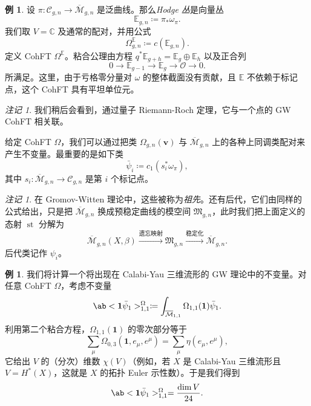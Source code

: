 \documentclass{amsart}
\theoremstyle{definition}
\newtheorem{exm}[thm]{例}
\theoremstyle{remark}
\newtheorem{rmk}[thm]{注记}
\theoremstyle{plain}
\theoremstyle{definition}
\theoremstyle{remark}
\newcommand{\C}{\mathbb{C}}
\newcommand{\E}{\mathbb{E}}
\newcommand{\Mbar}{\overline{\mathcal{M}}}
\newcommand{\mc}[1]{\mathcal{#1}}
\newcommand{\mf}[1]{\mathfrak{#1}}
\newcommand{\mbf}[1]{\mathbf{#1}}
\newcommand{\bv}{\mbf{v}}
\newcommand{\1}{\mathbf{1}}
\newcommand{\2}{\mathbf{2}}
\newcommand{\3}{\mathbf{3}}
\DeclareMathOperator{\st}{st}
\begin{document}
\begin{exm}
    设 $\pi \colon \mc{C}_{g,n} \to \Mbar_{g,n}$ 是泛曲线。那么\textit{Hodge 丛}是向量丛
    \[ \E_{g,n} \coloneqq \pi_* \omega_{\pi}. \]
    我们取 $V = \C$ 及通常的配对，并用公式
    \[ \Omega^{\E}_{g,n} \coloneqq c(\E_{g,n}). \]
    定义 CohFT $\Omega^{\E}$。粘合公理由方程 $q^* \E_{g+h} = \E_g \oplus \E_h$ 以及正合列
    \[ 0 \to \E_{g-1} \to \E_g \to \mc{O} \to 0. \]
    所满足。这里，由于亏格零分量对 $\omega$ 的整体截面没有贡献，且 $\E$ 不依赖于标记点，这个 CohFT 具有平坦单位元。
\end{exm}

\begin{rmk}
    我们稍后会看到，通过量子 Riemann-Roch 定理，它与一个点的 GW CohFT 相关联。
\end{rmk}

给定 CohFT $\Omega$，我们可以通过把类 $\Omega_{g,n}(\bv)$ 与 $\Mbar_{g,n}$ 上的各种上同调类配对来产生不变量。最重要的是如下类
\[ \bar{\psi}_i \coloneqq c_1( s_i^* \omega_{\pi} ), \]
其中 $s_i \colon \Mbar_{g,n} \to \mc{C}_{g,n}$ 是第 $i$ 个标记点。

\begin{rmk}
    在 Gromov-Witten 理论中，这些被称为\textit{祖先}。还有后代，它们由同样的公式给出，只是把 $\Mbar_{g,n}$ 换成预稳定曲线的模空间 $\mf{M}_{g,n}$，此时我们把上面定义的态射 $\st$ 分解为
    \[ \Mbar_{g,n}(X,\beta) \xrightarrow{\text{遗忘映射}} \mf{M}_{g,n} \xrightarrow{\text{稳定化}} \Mbar_{g,n}. \]
    后代类记作 $\psi_i$。
\end{rmk}

\begin{exm}
    我们将计算一个将出现在 Calabi-Yau 三维流形的 GW 理论中的不变量。对任意 CohFT $\Omega$，考虑不变量
    \[ \ab<\1\bar{\psi}_1>_{1,1}^{\Omega}\coloneqq \int_{\Mbar_{1,1}} \Omega_{1,1}(\1)\bar{\psi}_1. \]
    利用第二个粘合方程，$\Omega_{1,1}(\1)$ 的零次部分等于
    \[ \sum_{\mu} \Omega_{0,3}(\1, e_{\mu}, e^{\mu}) = \sum_{\mu} \eta(e_{\mu}, e^{\mu}), \]
    它给出 $V$ 的（分次）维数 $\chi(V)$（例如，若 $X$ 是 Calabi-Yau 三维流形且 \(V = H^*(X)\)，这就是 $X$ 的拓扑 Euler 示性数）。于是我们得到
    \[ \ab<\1\bar{\psi}_1>_{1,1}^{\Omega} = \frac{\dim V}{24}. \]
\end{exm}
\end{document}
